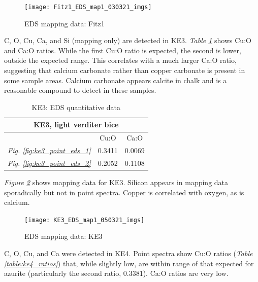\begin{figure}[H]
\centering
  \texttt{[image: Fitz1\_EDS\_map1\_030321\_imgs]}
\caption[EDS mapping data: Fitz1]{EDS mapping data: Fitz1}
\label{fig:fitz1_map1}
\end{figure}


C, O, Cu, Ca, and Si (mapping only) are detected in KE3. \textit{Table \ref{table:ke3_ratios}} shows Cu:O and Ca:O ratios. While the first Cu:O ratio is expected, the second is lower, outside the expected range. This correlates with a much larger Ca:O ratio, suggesting that calcium carbonate rather than copper carbonate is present in some sample areas. Calcium carbonate appears calcite in chalk and is a reasonable compound to detect in these samples.

\begin{table}[H]
\caption{KE3: EDS quantitative data}
\centering
\label{table:ke3_ratios}
\begin{tabular}{c c c}
\toprule
\multicolumn{3}{c}{KE3, light verditer bice} \\
\midrule
~ & Cu:O & Ca:O \\
\midrule
\textit{Fig. \ref{fig:ke3_point_eds_1}} & 0.3411 & 0.0069 \\
\textit{Fig. \ref{fig:ke3_point_eds_2}} & 0.2052 & 0.1108 \\
\bottomrule
\end{tabular}
\end{table}

\textit{Figure \ref{fig:ke3_map1}} shows mapping data for KE3. Silicon appears in mapping data sporadically but not in point spectra. Copper is correlated with oxygen, as is calcium.

\begin{figure}[H]
\centering
  \texttt{[image: KE3\_EDS\_map1\_050321\_imgs]}
\caption[EDS mapping data: KE3]{EDS mapping data: KE3}
\label{fig:ke3_map1}
\end{figure}


C, O, Cu, and Ca were detected in KE4. Point spectra show Cu:O ratios (\textit{Table \ref{table:ke4_ratios}}) that, while slightly low, are within range of that expected for azurite (particularly the second ratio, 0.3381). Ca:O ratios are very low.


